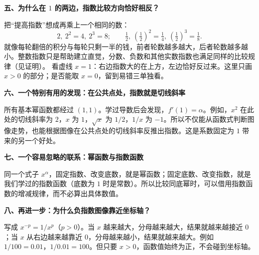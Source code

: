 \clearpage
\begin{explanationbox}
\textbf{\textcolor{CExplanation}{五、为什么在 $1$ 的两边，指数比较方向恰好相反？}}



  把“提高指数”想成再乘上一个相同的数：
  \[
     2,\ 2^2=4,\ 2^3=8;\qquad
     \tfrac12,\ (\tfrac12)^2=\tfrac14,\ (\tfrac12)^3=\tfrac18.
  \]
  就像每轮翻倍的积分与每轮只剩一半的钱，前者轮数越多越大，后者轮数越多越小。整数指数只是帮助建立直觉，分数、负数和其他实数指数也满足同样的比较规律（见证明）。
  看虚线 $x=1$：右边指数大的在上方，左边恰好反过来。这里只画 $x>0$ 的部分；是否能取 $x=0$，留到易错三单独看。

  \medskip
  
\end{explanationbox}
\clearpage
\begin{explanationbox}
\textbf{\textcolor{CExplanation}{六、一个特别有用的发现：在公共点处，指数就是切线斜率}}



  所有基本幂函数都经过 $(1,1)$。学过导数后会发现，$f'(1)=\alpha$。例如，$x^2$ 在此处的切线斜率为 $2$，$x$ 为 $1$，$\sqrt{x}$ 为 $1/2$，$1/x$ 为 $-1$。所以不仅能从函数式判断图像走势，也能根据图像在公共点处的切线斜率反推出指数。这是系数固定为 $1$ 带来的另一个好处。

  \medskip
  
\end{explanationbox}
\clearpage
\begin{explanationbox}
\textbf{\textcolor{CExplanation}{七、一个容易忽略的联系：幂函数与指数函数}}



  同一个式子 $x^\alpha$，固定指数、改变底数，就是幂函数；固定底数、改变指数，就是我们学过的指数函数（底数为 $1$ 时是常数）。所以比较同底幂时，可以借用指数函数的增减规律，而不必算出具体数值。

  \medskip
  
\end{explanationbox}
\clearpage
\begin{explanationbox}
\textbf{\textcolor{CExplanation}{八、再进一步：为什么负指数图像靠近坐标轴？}}



  写成 $x^{-p}=1/x^p$（$p>0$）。当 $x$ 越来越大，分母越来越大，结果就越来越接近 $0$；当 $x$ 从右边越来越靠近 $0$，分母越来越小，结果就越来越大。例如 $1/100=0.01$，$1/0.01=100$。但只要 $x>0$，函数值始终为正，不会碰到坐标轴。
\end{explanationbox}
